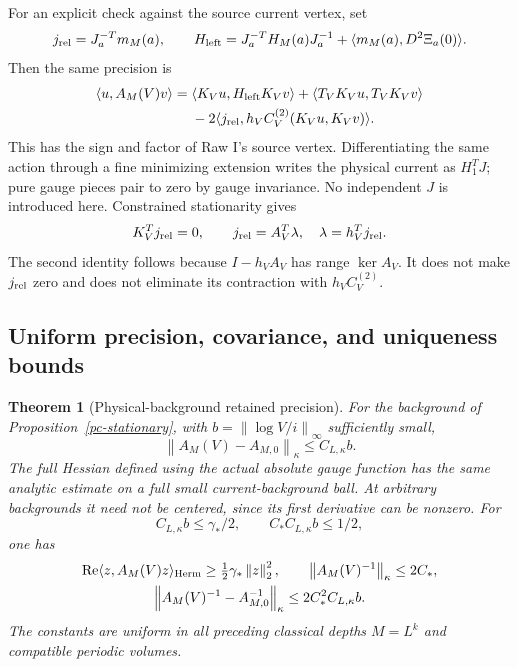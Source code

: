 \documentclass[11pt]{article}
\newtheorem{theorem}{Theorem}[section]
\newcommand{\norm}[1]{\left\|#1\right\|}
\begin{document}
For an explicit check against the source current vertex, set
\[
 j_{\rm rel}=J_a^{-T}m_M(a),\qquad
 H_{\rm left}=J_a^{-T}H_M(a)J_a^{-1}
                     +\langle m_M(a),D^2\Xi_a(0)\rangle.
\]
Then the same precision is
\begin{equation}\label{pc-source-current-form}
 \begin{split}
 \langle u,A_M(V)v\rangle={}&
 \langle K_Vu,H_{\rm left}K_Vv\rangle
 +\langle T_VK_Vu,T_VK_Vv\rangle\\
 &-2\langle j_{\rm rel},h_VC_V^{(2)}(K_Vu,K_Vv)\rangle.
 \end{split}
\end{equation}
This has the sign and factor of Raw I's source vertex.
Differentiating the same action through a fine minimizing
extension writes the physical current as $H_1^TJ$; pure gauge
pieces pair to zero by gauge invariance. No independent $J$
is introduced here. Constrained stationarity gives
\begin{equation}\label{pc-current-stationarity}
 K_V^Tj_{\rm rel}=0,\qquad
 j_{\rm rel}=A_V^T\lambda,\quad \lambda=h_V^Tj_{\rm rel}.
\end{equation}
The second identity follows because $I-h_VA_V$ has range
$\ker A_V$. It does not make $j_{\rm rel}$ zero and does
not eliminate its contraction with $h_VC_V^{(2)}$.

\subsection{Uniform precision, covariance, and uniqueness bounds}
\label{pc-bounds-section}

\begin{theorem}[Physical-background retained precision]
\label{pc-precision-theorem}
For the background of Proposition~\ref{pc-stationary}, with
$b=\norm{\log V/i}_\infty$ sufficiently small,
\begin{equation}\label{pc-precision-perturbation}
 \norm{A_M(V)-A_{M,0}}_\kappa\le C_{L,\kappa}b.
\end{equation}
The full Hessian defined using the actual absolute gauge
function has the same analytic estimate on a full small
current-background ball. At arbitrary backgrounds it need
not be centered, since its first derivative can be nonzero.
For
\begin{equation}\label{pc-radius}
 C_{L,\kappa}b\le\gamma_*/2,\qquad
 C_*C_{L,\kappa}b\le1/2,
\end{equation}
one has
\begin{equation}\label{pc-inverse-bounds}
 \begin{gathered}
 \operatorname{Re}\langle z,A_M(V)z\rangle_{\rm Herm}
       \ge\tfrac12\gamma_*\norm z_2^2,\qquad
 \norm{A_M(V)^{-1}}_\kappa\le2C_*,\\
 \norm{A_M(V)^{-1}-A_{M,0}^{-1}}_\kappa
       \le2C_*^2C_{L,\kappa}b.
 \end{gathered}
\end{equation}
The constants are uniform in all preceding classical depths
$M=L^k$ and compatible periodic volumes.
\end{theorem}
\end{document}

